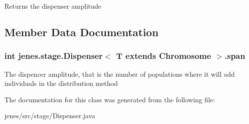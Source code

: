 \begin{DoxyReturn}{Returns}
the dispenser amplitude 
\end{DoxyReturn}


\subsection{Member Data Documentation}
\hypertarget{classjenes_1_1stage_1_1_dispenser_3_01_t_01extends_01_chromosome_01_4_a8f9bc0997e0536729db0c55bc9e240a5}{
\subsubsection[{span}]{\setlength{\rightskip}{0pt plus 5cm}int jenes.\-stage.\-Dispenser$<$ T extends Chromosome $>$.span\hspace{0.3cm}{\ttfamily [protected]}}}\label{classjenes_1_1stage_1_1_dispenser_3_01_t_01extends_01_chromosome_01_4_a8f9bc0997e0536729db0c55bc9e240a5}
The dispencer amplitude, that is the number of populations where it will add individuals in the distribution method 

The documentation for this class was generated from the following file\-:\begin{DoxyCompactItemize}
\item 
jenes/src/stage/Dispenser.\-java\end{DoxyCompactItemize}
